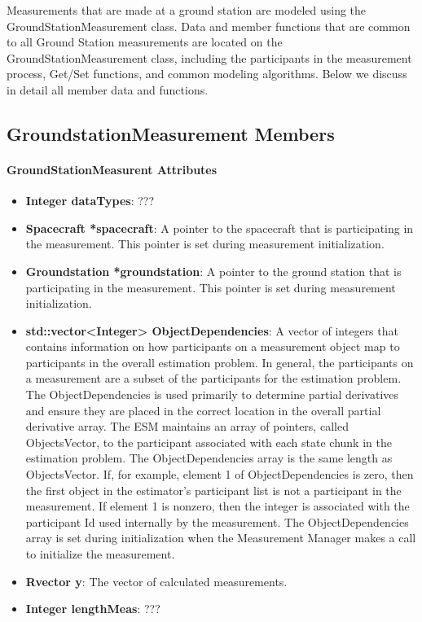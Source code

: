 Measurements that are made at a ground station are modeled using the GroundStationMeasurement class.  Data and member functions that are common to all Ground Station measurements are located on the GroundStationMeasurement class, including the participants in the measurement process, Get/Set functions, and common modeling algorithms.   Below we discuss in detail all member data and functions.

\subsection{GroundstationMeasurement Members}

\paragraph{GroundStationMeasurent Attributes}

\begin{itemize}
\item \textbf{Integer dataTypes}:  ???
\item \textbf{Spacecraft *spacecraft}:  A pointer to the spacecraft that is participating in the measurement. This pointer is set during measurement initialization.
\item \textbf{Groundstation *groundstation}:  A pointer to the ground station that is participating in the measurement.  This pointer is set during measurement initialization.
\item \textbf{std::vector<Integer> ObjectDependencies}: A vector of integers that contains information on how participants on a measurement object map to participants in the overall estimation problem.  In general, the participants on a measurement are a subset of the participants for the estimation problem.  The ObjectDependencies is used primarily to determine partial derivatives and ensure they are placed in the correct location in the overall partial derivative array.  The ESM maintains an array of pointers, called ObjectsVector, to the participant associated with each state chunk in the estimation problem.  The ObjectDependencies array is the same length as ObjectsVector.  If, for example, element 1 of ObjectDependencies is zero, then the first object in the estimator's participant list is not a participant in the measurement.  If element 1 is nonzero, then the integer is associated with the participant Id used internally by the measurement.  The ObjectDependencies array is set during initialization when the Measurement Manager makes a call to initialize the measurement.
\item \textbf{Rvector y}:  The vector of calculated measurements.
\item \textbf{Integer lengthMeas}:  ???
\end{itemize}

